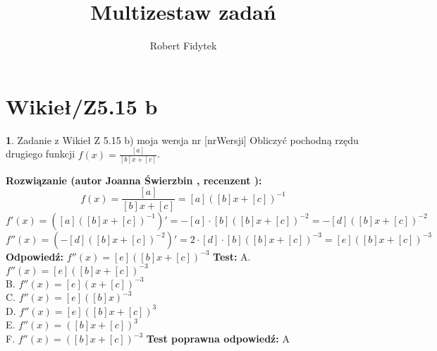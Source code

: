 \documentclass[12pt, a4paper]{article}
\title{Multizestaw zadań}
\author{Robert Fidytek}
\date{}
\theoremstyle{definition} %
\newtheorem{zad}{}
\newcommand{\kategoria}[1]{\section{#1}} %
\newcommand{\zadStart}[1]{\begin{zad}#1\newline} %
\newcommand{\zadStop}{\end{zad}}   %
\newcommand{\rozwStart}[2]{\noindent \textbf{Rozwiązanie (autor #1 , recenzent #2): }\newline} %
\newcommand{\rozwStop}{\newline}                                            %
\newcommand{\odpStart}{\noindent \textbf{Odpowiedź:}\newline}    %
\newcommand{\odpStop}{\newline}                                             %
\newcommand{\testStart}{\noindent \textbf{Test:}\newline} %
\newcommand{\testStop}{\newline} %
\newcommand{\kluczStart}{\noindent \textbf{Test poprawna odpowiedź:}\newline} %
\newcommand{\kluczStop}{\newline} %
\begin{document}
\maketitle


\kategoria{Wikieł/Z5.15 b}
\zadStart{Zadanie z Wikieł Z 5.15 b) moja wersja nr [nrWersji]}
Obliczyć pochodną rzędu drugiego funkcji $f(x)=\frac{[a]}{[b]x+[c]}$.
\zadStop
\rozwStart{Joanna Świerzbin}{}
$$f(x)=\frac{[a]}{[b]x+[c]}=[a]([b]x+[c])^{-1}$$
$$f'(x)= \left( [a]([b]x+[c])^{-1} \right)' = -[a]\cdot [b]([b]x+[c])^{-2} = -[d]([b]x+[c])^{-2} $$
$$f''(x)= \left( -[d]([b]x+[c])^{-2} \right)'= 2\cdot[d]\cdot[b]([b]x+[c])^{-3} = [e]([b]x+[c])^{-3}$$
\rozwStop
\odpStart
$f''(x) = [e]([b]x+[c])^{-3} $
\odpStop
\testStart
A. $f''(x) = [e]([b]x+[c])^{-3} $\\
B. $f''(x) = [e](x+[c])^{-3} $ \\
C. $f''(x) = [e]([b]x)^{-3} $ \\
D. $f''(x) = [e]([b]x+[c])^{3} $\\
E. $f''(x) = ([b]x+[c])^{3} $\\
F. $f''(x) = ([b]x+[c])^{-3} $
\testStop
\kluczStart
A
\kluczStop
\end{document}
